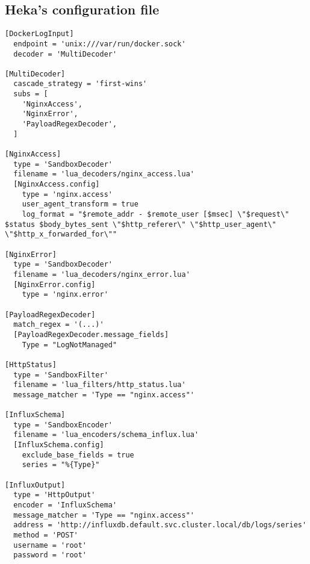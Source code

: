 \subsection{Heka's configuration file}\label{hekas-configuration-file}

\begin{verbatim}
[DockerLogInput]
  endpoint = 'unix:///var/run/docker.sock'
  decoder = 'MultiDecoder'

[MultiDecoder]
  cascade_strategy = 'first-wins'
  subs = [
    'NginxAccess',
    'NginxError',
    'PayloadRegexDecoder',
  ]

[NginxAccess]
  type = 'SandboxDecoder'
  filename = 'lua_decoders/nginx_access.lua'
  [NginxAccess.config]
    type = 'nginx.access'
    user_agent_transform = true
    log_format = "$remote_addr - $remote_user [$msec] \"$request\" $status $body_bytes_sent \"$http_referer\" \"$http_user_agent\" \"$http_x_forwarded_for\""

[NginxError]
  type = 'SandboxDecoder'
  filename = 'lua_decoders/nginx_error.lua'
  [NginxError.config]
    type = 'nginx.error'

[PayloadRegexDecoder]
  match_regex = '(...)'
  [PayloadRegexDecoder.message_fields]
    Type = "LogNotManaged"

[HttpStatus]
  type = 'SandboxFilter'
  filename = 'lua_filters/http_status.lua'
  message_matcher = 'Type == "nginx.access"'

[InfluxSchema]
  type = 'SandboxEncoder'
  filename = 'lua_encoders/schema_influx.lua'
  [InfluxSchema.config]
    exclude_base_fields = true
    series = "%{Type}"

[InfluxOutput]
  type = 'HttpOutput'
  encoder = 'InfluxSchema'
  message_matcher = 'Type == "nginx.access"'
  address = 'http://influxdb.default.svc.cluster.local/db/logs/series'
  method = 'POST'
  username = 'root'
  password = 'root'
\end{verbatim}